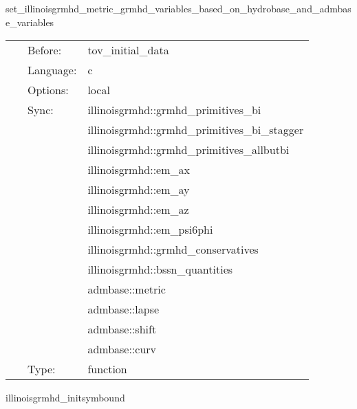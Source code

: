 \vspace{5mm}


\hspace{5mm} set\_illinoisgrmhd\_metric\_grmhd\_variables\_based\_on\_hydrobase\_and\_admbase\_variables 

\hspace{5mm}{\it convert hydrobase initial data (id) to id that illinoisgrmhd can read. } 


\hspace{5mm}

 \begin{tabular*}{160mm}{cll} 
~ & Before:  & tov\_initial\_data \\ 
~ & Language:  & c \\ 
~ & Options:  & local \\ 
~ & Sync:  & illinoisgrmhd::grmhd\_primitives\_bi \\ 
~& ~ &illinoisgrmhd::grmhd\_primitives\_bi\_stagger\\ 
~& ~ &illinoisgrmhd::grmhd\_primitives\_allbutbi\\ 
~& ~ &illinoisgrmhd::em\_ax\\ 
~& ~ &illinoisgrmhd::em\_ay\\ 
~& ~ &illinoisgrmhd::em\_az\\ 
~& ~ &illinoisgrmhd::em\_psi6phi\\ 
~& ~ &illinoisgrmhd::grmhd\_conservatives\\ 
~& ~ &illinoisgrmhd::bssn\_quantities\\ 
~& ~ &admbase::metric\\ 
~& ~ &admbase::lapse\\ 
~& ~ &admbase::shift\\ 
~& ~ &admbase::curv\\ 
~ & Type:  & function \\ 
\end{tabular*} 


\vspace{5mm}


\hspace{5mm} illinoisgrmhd\_initsymbound 

\hspace{5mm}{\it schedule symmetries -- actually just a placeholder function to ensure prolongation / processor syncs are done before the primitives solver. } 



